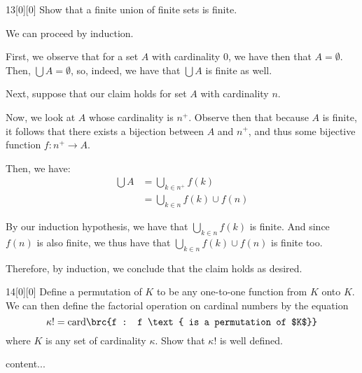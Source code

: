\documentclass{article}
\begin{document}
\begin{hw}{13}[0][0]
	Show that a finite union of finite sets is finite.
\end{hw}
\begin{solution}
	We can proceed by induction.
	
	First, we observe that for a set $A$ with cardinality $0$, we have then that $A = \emptyset$. Then, $\bigcup A = \emptyset$, so, indeed, we have that $\bigcup A$ is finite as well.
	
	Next, suppose that our claim holds for set $A$ with cardinality $n$.
	
	Now, we look at $A$ whose cardinality is $n^{+}$. Observe then that because $A$ is finite, it follows that there exists a bijection between $A$ and $n^{+}$, and thus some bijective function $f : n^{+} \rightarrow A$.
	
	Then, we have:
	\begin{align*}
		\bigcup A &= \bigcup_{k \in n^{+}} f(k) \\
		&= \bigcup_{k \in n} f(k) \cup f(n)
	\end{align*}

	By our induction hypothesis, we have that $\bigcup_{k \in n} f(k)$ is finite. And since $f(n)$ is also finite, we thus have that $\bigcup_{k \in n} f(k) \cup f(n)$ is finite too.
	
	Therefore, by induction, we conclude that the claim holds as desired.
\end{solution}

\begin{hw}{14}[0][0]
	Define a permutation of $K$ to be any one-to-one function from $K$
	onto $K$. We can then define the factorial operation on cardinal numbers by the equation
	\begin{equation*}
		\kappa ! = \mathrm{card} \brc{f : f \text{ is a permutation of $K$}}
	\end{equation*}
	where $K$ is any set of cardinality $\kappa$. Show that $\kappa !$ is well defined.
\end{hw}
\begin{solution}
	content...
\end{solution}
\end{document}

